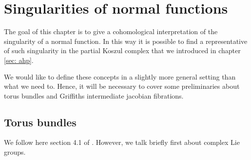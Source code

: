 \documentclass[a4paper,12 pt,titlepage,twoside]{book}
\theoremstyle{plain}
\theoremstyle{theorem}
\theoremstyle{definition}
\theoremstyle{remark}
\begin{document}
\chapter{Singularities of normal functions}\label{sec: singularities of normal functions}
	The goal of this chapter is to give a cohomological interpretation of the singularity of a normal function. In this way it is possible to find a representative of such singularity in the partial Koszul complex that we introduced in chapter \ref{sec: ahp}.
	
	We would like to define these concepts in a slightly more general setting than what we need to. Hence, it will be necessary to cover some preliminaries about torus bundles and Griffiths intermediate jacobian fibrations.
	\section{Torus bundles}
	We follow here section 4.1 of \cite{MR3184171}. However, we talk briefly first about complex Lie groups.
	
\end{document}
